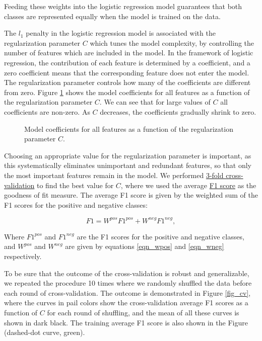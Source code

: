 \documentclass[10pt,parskip=half,
toc=sectionentrywithdots,
bibliography=totocnumbered,
captions=tableheading,numbers=noendperiod]{scrartcl}
\begin{document}
Feeding these weights into the logistic regression model guarantees that
both classes are represented equally when the model is trained on the
data.

The \(l_1\) penalty in the logistic regression model is associated with
the regularization parameter \(C\) which tunes the model complexity, by
controlling the number of features which are included in the model. In
the framework of logistic regression, the contribution of each feature
is determined by a coefficient, and a zero coefficient means that the
corresponding feature does not enter the model. The regularization
parameter controls how many of the coefficients are different from zero.
Figure \ref{fig_l1} shows the model coefficients for all features as a
function of the regularization parameter \(C\). We can see that for
large values of \(C\) all coefficients are non-zero. As \(C\) decreases,
the coefficients gradually shrink to zero.

\begin{figure}[H]\begin{center}\end{center}\caption{Model coefficients for all features as a function of the regularization
parameter \(C\).}\label{fig_l1}\end{figure}

Choosing an appropriate value for the regularization parameter is
important, as this systematically eliminates unimportant and redundant
features, so that only the most important features remain in the model.
We performed
\href{https://towardsdatascience.com/why-and-how-to-cross-validate-a-model-d6424b45261f}{3-fold
cross-validation} to find the best value for \(C\), where we used the
average \href{https://en.wikipedia.org/wiki/F1_score}{F1 score} as the
goodness of fit measure. The average F1 score is given by the weighted
sum of the F1 scores for the positive and negative classes:

\begin{equation}\label{eqn_F}
F1=W^{pos}F1^{pos}+W^{neg}F1^{neg},
\end{equation}

Where \(F1^{pos}\) and \(F1^{neg}\) are the F1 scores for the positive
and negative classes, and \(W^{pos}\) and \(W^{neg}\) are given by
equations \ref{eqn_wpos} and \ref{eqn_wneg} respectively.

To be sure that the outcome of the cross-validation is robust and
generalizable, we repeated the procedure 10 times where we randomly
shuffled the data before each round of cross-validation. The outcome is
demonstrated in Figure \ref{fig_cv}, where the curves in pail colors
show the cross-validation average F1 scores as a function of \(C\) for
each round of shuffling, and the mean of all these curves is shown in
dark black. The training average F1 score is also shown in the Figure
(dashed-dot curve, green).
\end{document}
